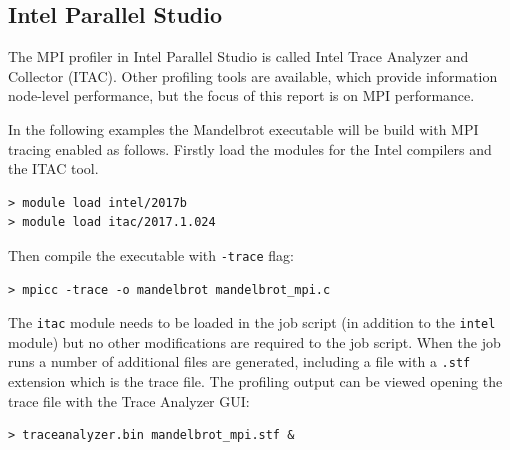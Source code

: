 \documentclass[a4paper,titlepage]{article}
\begin{document}

\subsection{Intel Parallel Studio}

The MPI profiler in Intel Parallel Studio is called Intel Trace Analyzer and Collector (ITAC). Other profiling tools are available, which provide information node-level performance, but the focus of this report is on MPI performance.

In the following examples the Mandelbrot executable will be build with MPI tracing enabled as follows. Firstly load the modules for the Intel compilers and the ITAC tool. 
\begin{verbatim}
> module load intel/2017b
> module load itac/2017.1.024
\end{verbatim}
Then compile the executable with \texttt{-trace} flag:
\begin{verbatim}
> mpicc -trace -o mandelbrot mandelbrot_mpi.c
\end{verbatim}
The \texttt{itac} module needs to be loaded in the job script (in addition to the \texttt{intel} module) but no other modifications are required to the job script. When the job runs a number of additional files are generated, including a file with a \texttt{.stf} extension which is the trace file.
The profiling output can be viewed opening the trace file with the Trace Analyzer GUI:
\begin{verbatim}
> traceanalyzer.bin mandelbrot_mpi.stf &
\end{verbatim}
\end{document}
